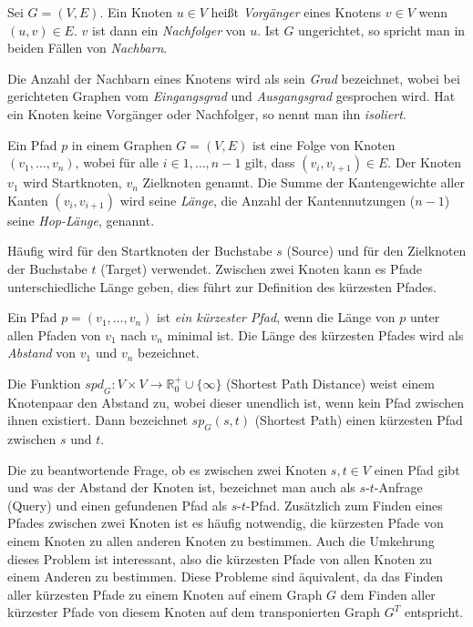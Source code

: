 \begin{definition}[Nachbar]
  Sei $G = (V, E)$. Ein Knoten $u \in V$ heißt \emph{Vorgänger} eines Knotens $v \in V$ wenn $(u, v) \in E$. $v$ ist dann ein \emph{Nachfolger} von $u$.
  Ist $G$ ungerichtet, so spricht man in beiden Fällen von \emph{Nachbarn}.
\end{definition}

Die Anzahl der Nachbarn eines Knotens wird als sein \emph{Grad} bezeichnet, wobei bei gerichteten Graphen vom \emph{Eingangsgrad} und \emph{Ausgangsgrad} gesprochen wird.
Hat ein Knoten keine Vorgänger oder Nachfolger, so nennt man ihn \emph{isoliert}.

\begin{definition}[Pfad]
  Ein Pfad $p$ in einem Graphen $G = (V, E)$ ist eine Folge von Knoten $(v_1, \dotsc, v_n)$, wobei für alle $i \in {1, \dotsc, n-1}$ gilt, dass $(v_i, v_{i+1}) \in E$.
  Der Knoten $v_1$ wird Startknoten, $v_n$ Zielknoten genannt.
  Die Summe der Kantengewichte aller Kanten $(v_i, v_{i + 1})$ wird seine \emph{Länge}, die Anzahl der Kantennutzungen ($n - 1$) seine \emph{Hop-Länge}, genannt.
\end{definition}

Häufig wird für den Startknoten der Buchstabe $s$ (Source) und für den Zielknoten der Buchstabe $t$ (Target) verwendet.
Zwischen zwei Knoten kann es Pfade unterschiedliche Länge geben, dies führt zur Definition des kürzesten Pfades.

\begin{definition}
  Ein Pfad $p = (v_1 , \dotsc , v_n)$ ist \emph{ein kürzester Pfad}, wenn die Länge von $p$ unter allen Pfaden von $v_1$ nach $v_n$ minimal ist.
  Die Länge des kürzesten Pfades wird als \emph{Abstand} von $v_1$ und $v_n$ bezeichnet.

  Die Funktion ${spd}_G \colon V \times V \to \mathbb{R}^+_0 \cup \{ \infty \} $ (Shortest Path Distance) weist einem Knotenpaar den Abstand zu, wobei dieser unendlich ist, wenn kein Pfad zwischen ihnen existiert.
  Dann bezeichnet ${sp}_{G} (s, t)$ (Shortest Path) einen kürzesten Pfad zwischen $s$ und $t$.
\end{definition}

Die zu beantwortende Frage, ob es zwischen zwei Knoten $s, t \in V$ einen Pfad gibt und was der Abstand der Knoten ist, bezeichnet man auch als $s$-$t$-Anfrage (Query) und einen gefundenen Pfad als $s$-$t$-Pfad.
Zusätzlich zum Finden eines Pfades zwischen zwei Knoten ist es häufig notwendig, die kürzesten Pfade von einem Knoten zu allen anderen Knoten zu bestimmen.
Auch die Umkehrung dieses Problem ist interessant, also die kürzesten Pfade von allen Knoten zu einem Anderen zu bestimmen.
Diese Probleme sind äquivalent, da das Finden aller kürzesten Pfade zu einem Knoten auf einem Graph $G$ dem Finden aller kürzester Pfade von diesem Knoten auf dem transponierten Graph $G^T$ entspricht.

